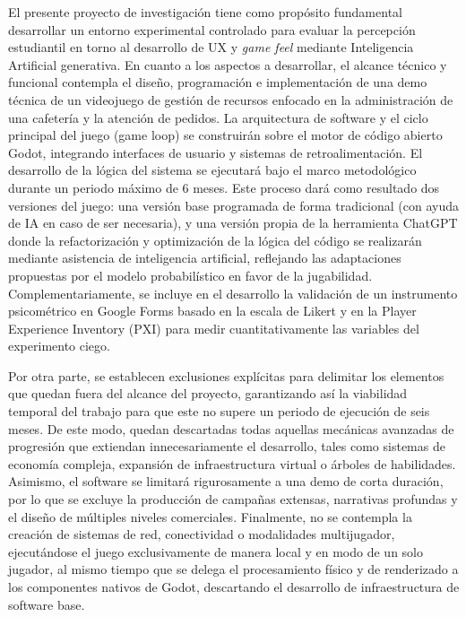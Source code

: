 El presente proyecto de investigación tiene como propósito fundamental desarrollar un entorno experimental controlado para evaluar la percepción estudiantil en torno al desarrollo de UX y \textit{game feel} mediante Inteligencia Artificial generativa. En cuanto a los aspectos a desarrollar, el alcance técnico y funcional contempla el diseño, programación e implementación de una demo técnica de un videojuego de gestión de recursos enfocado en la administración de una cafetería y la atención de pedidos. La arquitectura de software y el ciclo principal del juego (game loop) se construirán sobre el motor de código abierto Godot, integrando interfaces de usuario y sistemas de retroalimentación. El desarrollo de la lógica del sistema se ejecutará bajo el marco metodológico durante un periodo máximo de 6 meses. Este proceso dará como resultado dos versiones del juego: una versión base programada de forma tradicional (con ayuda de IA en caso de ser necesaria), y una versión propia de la herramienta ChatGPT donde la refactorización y optimización de la lógica del código se realizarán mediante asistencia de inteligencia artificial, reflejando las adaptaciones propuestas por el modelo probabilístico en favor de la jugabilidad. Complementariamente, se incluye en el desarrollo la validación de un instrumento psicométrico en Google Forms basado en la escala de Likert y en la Player Experience Inventory (PXI) para medir cuantitativamente las variables del experimento ciego.

Por otra parte, se establecen exclusiones explícitas para delimitar los elementos que quedan fuera del alcance del proyecto, garantizando así la viabilidad temporal del trabajo para que este no supere un periodo de ejecución de seis meses. De este modo, quedan descartadas todas aquellas mecánicas avanzadas de progresión que extiendan innecesariamente el desarrollo, tales como sistemas de economía compleja, expansión de infraestructura virtual o árboles de habilidades. Asimismo, el software se limitará rigurosamente a una demo de corta duración, por lo que se excluye la producción de campañas extensas, narrativas profundas y el diseño de múltiples niveles comerciales. Finalmente, no se contempla la creación de sistemas de red, conectividad o modalidades multijugador, ejecutándose el juego exclusivamente de manera local y en modo de un solo jugador, al mismo tiempo que se delega el procesamiento físico y de renderizado a los componentes nativos de Godot, descartando el desarrollo de infraestructura de software base.


